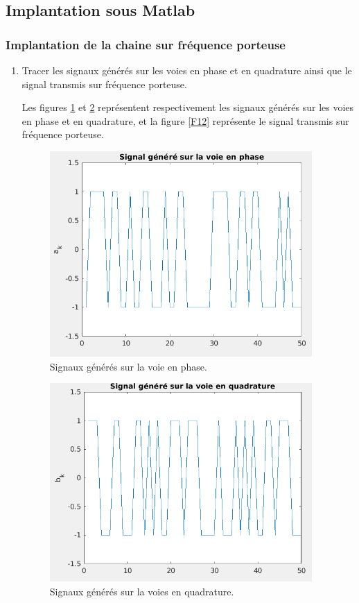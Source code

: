 \documentclass[frenchb]{article}
\begin{document}
\subsection{Implantation sous Matlab}
\subsubsection{Implantation de la chaine sur fréquence porteuse}
\begin{enumerate}
    \item Tracer les signaux générés sur les voies en phase et en quadrature ainsi que le signal transmis sur fréquence porteuse.
    \par\leavevmode\par
    \setlength\parindent{0.5cm}
    Les figures \ref{F11} et \ref{F111} représentent respectivement  les signaux générés sur les voies en phase et en quadrature, et la figure \ref{F12} représente le signal transmis sur fréquence porteuse. 
    \begin{figure}[ht!]
    		\centering
		\includegraphics[width=10cm]{C1phase.png}	              	 	\caption{Signaux générés sur la voie en phase. \label{F11}}
	\end{figure}
	
	\begin{figure}[ht!]
    		\centering
		\includegraphics[width=10cm]{C1quadra.png}	              	 	\caption{Signaux générés sur la voies en quadrature. \label{F111}}
	\end{figure}
	

\end{enumerate}
\end{document}
